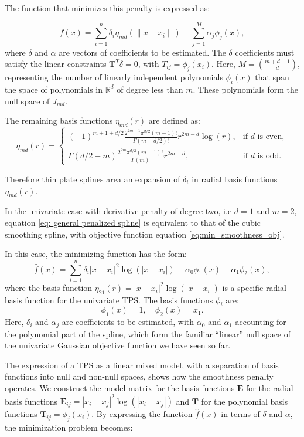 \documentclass[
11pt, %
oneside, %
english, %
singlespacing, %
]{macthesis} %
\begin{document}
The function that minimizes this penalty is expressed as:

\[
\hat{f}(x) = \sum_{i=1}^n \delta_i \eta_{md}(\|x - x_i\|) + \sum_{j=1}^M \alpha_j \phi_j(x),
\]
where \(\delta\) and \(\alpha\) are vectors of coefficients to be estimated. The \(\delta\) coefficients must satisfy the linear constraints \(\mathbf{T}^T \delta = 0\), with \(T_{ij} = \phi_j(x_i)\). Here, \(M = \binom{m+d-1}{d}\), representing the number of linearly independent polynomials \(\phi_i(x)\) that span the space of polynomials in \(\mathbb{R}^d\) of degree less than \(m\). These polynomials form the null space of \(J_{md}\).

The remaining basis functions \(\eta_{md}(r)\) are defined as:
\[
\eta_{md}(r) = 
\begin{cases} 
(-1)^{m+1+d/2} \frac{2^{2m-1} \pi^{d/2} (m-1)!}{\Gamma(m-d/2)!} r^{2m-d} \log(r), & \text{if } d \text{ is even}, \\
\Gamma(d/2 - m) \frac{2^{2m} \pi^{d/2} (m-1)!}{\Gamma(m)} r^{2m-d}, & \text{if } d \text{ is odd}.
\end{cases}
\]

Therefore thin plate splines area an expansion of \(\delta_i\) in radial basis functions \(\eta_{md} (r)\).

In the univariate case with derivative penalty of degree two, i.e \(d =  1\) and \(m = 2\), equation \ref{eq: general penalized spline} is equivalent to that of the cubic smoothing spline, with objective function equation \ref{eq:min_smoothness_obj}.

In this case, the minimizing function has the form:
\[
\hat{f}(x) = \sum_{i=1}^n \delta_i |x - x_i|^2 \log(|x - x_i|) + \alpha_0\phi_1(x) + \alpha_1 \phi_2(x),
\]
where the basis function \(\eta_{21}(r) =|x - x_i|^2 \log(|x - x_i|)\) is a specific radial basis function for the univariate TPS. The basis functions \(\phi_i\) are:
\[
\phi_1(x) = 1, \quad \phi_2(x) = x_1.
\]
Here, \(\delta_i\) and \(\alpha_j\) are coefficients to be estimated, with \(\alpha_0\) and \(\alpha_1\) accounting for the polynomial part of the spline, which form the familiar ``linear'' null space of the univariate Gaussian objective function we have seen so far.

The expression of a TPS as a linear mixed model, with a separation of basis functions into null and non-null spaces, shows how the smoothness penalty operates. We construct the model matrix for the basis functions \(\mathbf{E}\) for the radial basis functions \(\mathbf{E}_{ij} = |x_i - x_j|^2 \log(|x_i - x_j|)\) and \(\mathbf{T}\) for the polynomial basis functions \(\mathbf{T}_{ij} = \phi_j(x_i)\). By expressing the function \(\hat{f}(x)\) in terms of \(\delta\) and \(\alpha\), the minimization problem becomes:
\end{document}
